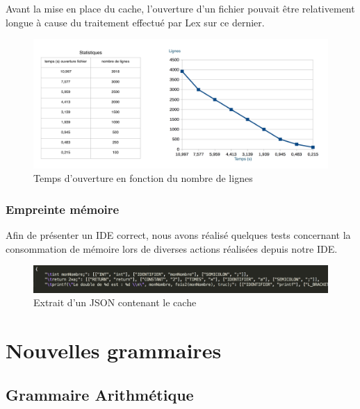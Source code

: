 \documentclass[a4paper,12pt]{article}
\begin{document}
		Avant la mise en place du cache, l'ouverture d'un fichier pouvait être relativement longue à cause du traitement effectué par Lex sur ce dernier.
		
		\begin{figure}[h!]
				\begin{center}
					\includegraphics[scale=0.5]{images/stats_ouverture}
					\caption{Temps d'ouverture en fonction du nombre de lignes}
				\end{center}
		\end{figure}
		
		\subsubsection{Empreinte mémoire}
		
		Afin de présenter un IDE correct, nous avons réalisé quelques tests concernant la consommation de mémoire lors de diverses actions réalisées depuis notre IDE.
		
		\begin{figure}[h!]
				\begin{center}
					\includegraphics[scale=0.5]{images/exempleJsonCache}
					\caption{Extrait d'un JSON contenant le cache}
				\end{center}
		\end{figure}

\section{Nouvelles grammaires}

	\subsection{Grammaire Arithmétique}
\end{document}

